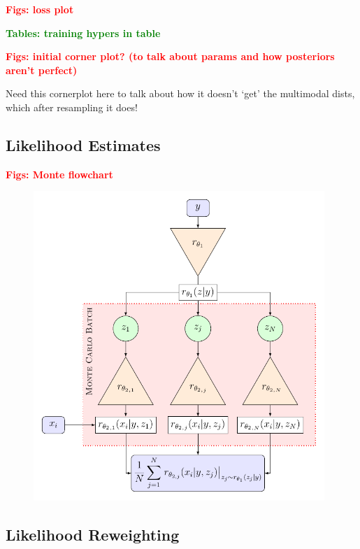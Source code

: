 \documentclass[aps,superscriptaddress,twocolumn,nopreprintnumbers,floatfix,groupedaddress]{revtex4-1}
\newcommand{\montefigwidth}{11cm}
\begin{document}
\textbf{\textcolor{red}{Figs: loss plot}}

\textbf{\textcolor{green}{Tables: training hypers in table}}

\textbf{\textcolor{red}{Figs: initial corner plot? (to talk about params and how posteriors aren't perfect)}}

Need this cornerplot here to talk about how it doesn't `get' the multimodal dists, which after resampling it does!

\subsection{Likelihood Estimates}

\textbf{\textcolor{red}{Figs: Monte flowchart}}

\begin{figure}
	\centering
	\includegraphics[width=\montefigwidth]{figs/tikz_monte.pdf}
	\caption{}
	\label{fig:monte_flow}
\end{figure}


\subsection{Likelihood Reweighting}
\end{document}
